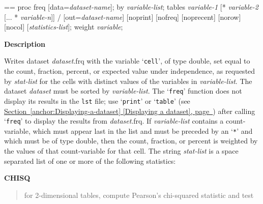 \documentclass{book}
\makeatletter
\newcommand\Texinfocommandstyletextvar[1]{{\normalfont{}\textsl{#1}}}%
\newenvironment{Texinfopreformatted}{%
  \par\GNUTobeylines\obeyspaces\frenchspacing\parskip=\z@\parindent=\z@}{}
{\catcode`\^^M=13 \gdef\GNUTobeylines{\catcode`\^^M=13 \def^^M{\null\par}}}
\newenvironment{Texinfoindented}{\begin{list}{}{}\item\relax}{\end{list}}
\renewcommand{\_}{\Texinfounderscore\discretionary{}{}{}}
\makeatother
\begin{document}
\begin{Texinfoindented}
\begin{Texinfopreformatted}%
proc freq [data=\Texinfocommandstyletextvar{dataset-name}];
by \Texinfocommandstyletextvar{variable-list};
tables \Texinfocommandstyletextvar{variable-1} [* \Texinfocommandstyletextvar{variable-2} [... * \Texinfocommandstyletextvar{variable-n}]] /
             [out=\Texinfocommandstyletextvar{dataset-name}] [noprint] [nofreq] [noprecent]
             [norow] [nocol] [\Texinfocommandstyletextvar{statistics-list}];
weight \Texinfocommandstyletextvar{variable};
\end{Texinfopreformatted}
\end{Texinfoindented}

%
%
%
%
%

\noindent{}\textbf{Description}

Writes dataset \Texinfocommandstyletextvar{dataset}.frq with the variable `\texttt{\_cell\_}',
of type double, set equal to the count, fraction, percent, or expected value under
independence, as requested by \Texinfocommandstyletextvar{stat-list}
for the cells with distinct values of the variables in
\Texinfocommandstyletextvar{variable-list}.
The dataset \Texinfocommandstyletextvar{dataset} must be sorted by \Texinfocommandstyletextvar{variable-list}.
The `\texttt{freq}' function does not display its results in the \texttt{lst} file; use
`\texttt{print}' or `\texttt{table}' (see \hyperref[anchor:Displaying-a-dataset]{Section~\ref*{anchor:Displaying-a-dataset} [Displaying a dataset], page~\pageref*{anchor:Displaying-a-dataset}}) after calling
`\texttt{freq}' to display the results from \Texinfocommandstyletextvar{dataset}.frq.
If \Texinfocommandstyletextvar{variable-list} contains a count-variable,
which must appear last in the list and must be preceded by an `\texttt{*}'
and which must be of type double,
then the count, fraction, or percent is weighted by the values of that
count-variable for that cell.
The string \Texinfocommandstyletextvar{stat-list} is a space separated list of one or more of the following statistics:

\textbf{CHISQ}
%
\begin{quote}
for 2-dimensional tables, compute Pearson's chi-squared statistic and test
\end{quote}
\end{document}
